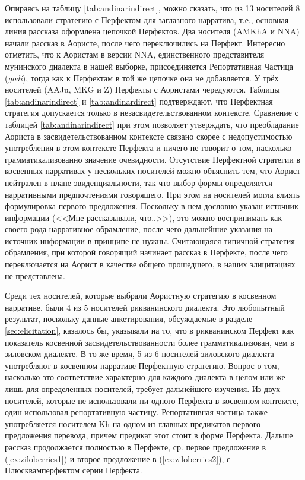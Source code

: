 Опираясь на таблицу \ref{tab:andinarindirect}, можно сказать, что из 13 носителей 8 использовали стратегию с Перфектом для заглазного нарратива, т.е., основная линия рассказа оформлена цепочкой Перфектов. Два носителя (AMKhA и NNA) начали рассказ в Аористе, после чего переключились на Перфект. Интересно отметить, что к Аористам в версии NNA, единственного представителя мунинского диалекта в нашей выборке, присоединяется Репортативная Частица (\textit{godi}), тогда как к Перфектам в той же цепочке она не добавляется. У трёх носителей (AAJu, MKG и Z) Перфекты с Аористами чередуются. Таблицы \ref{tab:andinarindirect} и \ref{tab:andinardirect} подтверждают, что Перфектная стратегия допускается только в незасвидетельствованном контексте. Сравнение с таблицей \ref{tab:andinarindirect} при этом позволяет утверждать, что преобладание Аориста в засвидетельствованном контексте связано скорее с недопустимостью употребления в этом контексте Перфекта и ничего не говорит о том, насколько грамматикализованно значение очевидности. Отсутствие Перфектной стратегии в косвенных нарративах у нескольких носителей можно объяснить тем, что Аорист нейтрален в плане эвиденциальности, так что выбор формы определяется нарративными предпочтениями говорящего. При этом на носителей могла влиять формулировка первого предложения. Поскольку в нем дословно указан источник информации (<<Мне рассказывали, что..>>), это можно воспринимать как своего рода нарративное обрамление, после чего дальнейшие указания на источник информации в принципе не нужны. Считающаяся типичной стратегия обрамления, при которой говорящий начинает рассказ в Перфекте, после чего переключается на Аорист в качестве общего прошедшего, в наших элицитациях не представлена.
\par Среди тех носителей, которые выбрали Аористную стратегию в косвенном нарративе, были 4 из 5 носителей рикванинского диалекта. Это любопытный результат, поскольку данные анкетирования, обсуждаемые в разделе \ref{sec:elicitation}, казалось бы, указывали на то, что в рикванинском Перфект как показатель косвенной засвидетельствованности более грамматикализован, чем в зиловском диалекте. В то же время, 5 из 6 носителей зиловского диалекта употребляют в косвенном нарративе Перфектную стратегию. Вопрос о том, насколько это соответствие характерно для каждого диалекта в целом или же лишь для определенных носителей, требует дальнейшего изучения. Из двух носителей, которые не использовали ни одного Перфекта в косвенном контексте, один использовал репортативную частицу. Репортативная частица также употребляется носителем Kh на одном из главных предикатов первого предложения перевода, причем предикат этот стоит в форме Перфекта. Дальше рассказ продолжается полностью в Перфекте, ср. первое предложение в (\ref{ex:ziloberries1}) и второе предложение в (\ref{ex:ziloberries2}), с Плюсквамперфектом серии Перфекта.

